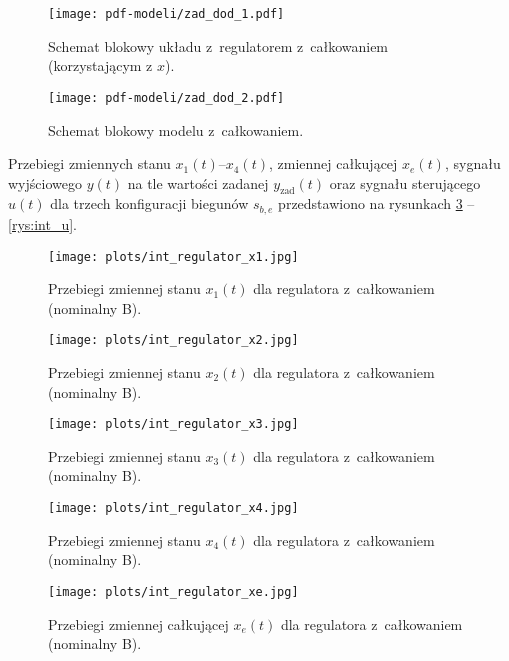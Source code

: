 \documentclass[a4paper,titlepage,11pt,floatssmall]{mwrep} %
\begin{document}
\begin{figure}[H]
    \centering
    \texttt{[image: pdf-modeli/zad\_dod\_1.pdf]} %
    \caption{Schemat blokowy układu z~regulatorem z~całkowaniem (korzystającym z $x$).}
    \label{rys:reg_int_simulink}
\end{figure}

\begin{figure}[H]
    \centering
    \texttt{[image: pdf-modeli/zad\_dod\_2.pdf]} %
    \caption{Schemat blokowy modelu z~całkowaniem.}
    \label{rys:reg_int_bmod_simulink}
\end{figure}

Przebiegi zmiennych stanu $x_1(t)$--$x_4(t)$, zmiennej całkującej $x_e(t)$, sygnału wyjściowego $y(t)$ na tle wartości zadanej $y_{\text{zad}}(t)$ oraz sygnału sterującego $u(t)$ dla trzech konfiguracji biegunów $s_{b,e}$ przedstawiono na rysunkach \ref{rys:int_x1} -- \ref{rys:int_u}.

\begin{figure}[H]
    \centering
    \texttt{[image: plots/int\_regulator\_x1.jpg]}
    \caption{Przebiegi zmiennej stanu $x_1(t)$ dla regulatora z~całkowaniem (nominalny B).}
    \label{rys:int_x1}
\end{figure}

\begin{figure}[H]
    \centering
    \texttt{[image: plots/int\_regulator\_x2.jpg]}
    \caption{Przebiegi zmiennej stanu $x_2(t)$ dla regulatora z~całkowaniem (nominalny B).}
    \label{rys:int_x2}
\end{figure}

\begin{figure}[H]
    \centering
    \texttt{[image: plots/int\_regulator\_x3.jpg]}
    \caption{Przebiegi zmiennej stanu $x_3(t)$ dla regulatora z~całkowaniem (nominalny B).}
    \label{rys:int_x3}
\end{figure}

\begin{figure}[H]
    \centering
    \texttt{[image: plots/int\_regulator\_x4.jpg]}
    \caption{Przebiegi zmiennej stanu $x_4(t)$ dla regulatora z~całkowaniem (nominalny B).}
    \label{rys:int_x4}
\end{figure}

\begin{figure}[H]
    \centering
    \texttt{[image: plots/int\_regulator\_xe.jpg]}
    \caption{Przebiegi zmiennej całkującej $x_e(t)$ dla regulatora z~całkowaniem (nominalny B).}
    \label{rys:int_xe}
\end{figure}
\end{document}
